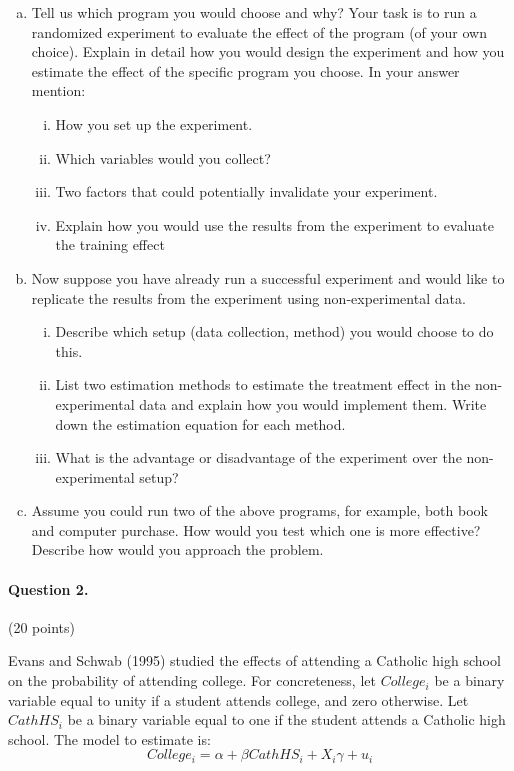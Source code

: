 \documentclass[a4paper, 12pt]{article}
\begin{document}
\begin{enumerate}[(a)]
	\item Tell us which program you would choose and why? Your task is to run a randomized experiment to evaluate the effect of the program (of your own choice).  Explain in detail how you would design the experiment and how you estimate the effect of the specific program you choose. In your answer mention:
	\begin{enumerate}[i)]
		\item How you set up the experiment.
		\item Which variables would you collect?
		\item Two factors that could potentially invalidate your experiment.
		\item Explain how you would use the results from the experiment to evaluate the training effect
	\end{enumerate}
	\item{} Now suppose you have already run a successful experiment and would like to replicate the results from the experiment using non-experimental data.
	\begin{enumerate}[i)]
		\item Describe which setup (data collection, method) you would choose to do this.
		\item List two estimation methods to estimate the treatment effect in the non-experimental data and explain how you would implement them. Write down the estimation equation for each method.
		\item What is the advantage or disadvantage of the experiment over the non-experimental setup?
	\end{enumerate}


	\item Assume you could run two of the above programs, for example, both book and computer purchase. How would you test which one is more effective? Describe how would you approach the problem.


\end{enumerate}

\paragraph{Question 2.} (20 points)

Evans and Schwab (1995) studied the effects of attending a Catholic high school on the probability of attending college. For concreteness, let $College_{i}$ be a binary variable equal to unity if a student attends college, and zero otherwise. Let $CathHS_{i}$ be a binary variable equal to one if the student attends a Catholic high school. The model to estimate is:
\begin{equation*}
	College_i = \alpha + \beta CathHS_i + X_i\gamma + u_i
\end{equation*}
\end{document}
